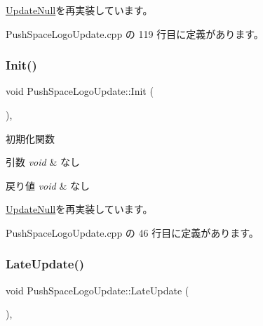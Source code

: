 \mbox{\hyperlink{class_update_null_a77aee1e614cf6dafe4f9af58b2205e4b}{Update\+Null}}を再実装しています。



 Push\+Space\+Logo\+Update.\+cpp の 119 行目に定義があります。

\mbox{\label{class_push_space_logo_update_a9c165604160c012b429c1db1d67ffb2a}} 
\subsubsection{\texorpdfstring{Init()}{Init()}}
{\footnotesize\ttfamily void Push\+Space\+Logo\+Update\+::\+Init (\begin{DoxyParamCaption}{ }\end{DoxyParamCaption})\hspace{0.3cm}{\ttfamily [override]}, {\ttfamily [virtual]}}



初期化関数 


\begin{DoxyParams}{引数}
{\em void} & なし \\
\hline
\end{DoxyParams}

\begin{DoxyRetVals}{戻り値}
{\em void} & なし \\
\hline
\end{DoxyRetVals}


\mbox{\hyperlink{class_update_null_abe9bc57c7932d2de47073c2709007432}{Update\+Null}}を再実装しています。



 Push\+Space\+Logo\+Update.\+cpp の 46 行目に定義があります。

\mbox{\label{class_push_space_logo_update_a4423864fb22b1211e92a4317d0b70a44}} 
\subsubsection{\texorpdfstring{Late\+Update()}{LateUpdate()}}
{\footnotesize\ttfamily void Push\+Space\+Logo\+Update\+::\+Late\+Update (\begin{DoxyParamCaption}{ }\end{DoxyParamCaption})\hspace{0.3cm}{\ttfamily [override]}, {\ttfamily [virtual]}}



